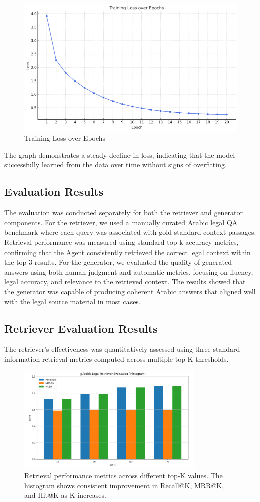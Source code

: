 \begin{figure}[h]
	\centering
	\includegraphics[width=0.7\linewidth]{Figures/finetunedresult.png}
	\caption{Training Loss over Epochs}
	\label{Training}
	
\end{figure}
The graph demonstrates a steady decline in loss, indicating that the model successfully learned from the data over time without signs of overfitting.

\newpage
\subsection{Evaluation Results}
The evaluation was conducted separately for both the retriever and generator components. For the retriever, we used a manually curated Arabic legal QA benchmark where each query was associated with gold-standard context passages. Retrieval performance was measured using standard top-k accuracy metrics, confirming that the Agent consistently retrieved the correct legal context within the top 3 results. For the generator, we evaluated the quality of generated answers using both human judgment and automatic metrics, focusing on fluency, legal accuracy, and relevance to the retrieved context. The results showed that the generator was capable of producing coherent Arabic answers that aligned well with the legal source material in most cases.
\subsection{Retriever Evaluation Results}
The retriever's effectiveness was quantitatively assessed using three standard information retrieval metrics computed across multiple top-K thresholds.
\begin{figure}[h]
	\centering
	\includegraphics[width=0.8\textwidth]{Figures/evalutionhisto.png}
	\caption{Retrieval performance metrics across different top-K values. The histogram shows consistent improvement in Recall@K, MRR@K, and Hit@K as K increases.}
	\label{fig:retriever_performance}
\end{figure}


